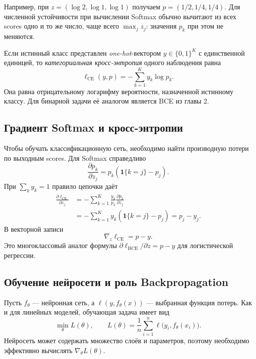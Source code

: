 \documentclass[12pt,a4paper]{article}
\begin{document}
Например, при $z=(\log2,\log1,\log1)$ получаем
$p=(1/2,1/4,1/4)$.
Для численной устойчивости при вычислении Softmax
обычно вычитают из всех scores одно и то же число,
чаще всего $\max_jz_j$: значения $p_k$ при этом не меняются.

Если истинный класс представлен \emph{one-hot}-вектором
$y\in\{0,1\}^K$ с единственной единицей, то
\emph{категориальная кросс-энтропия} одного наблюдения равна
\begin{equation}
    \ell_{\mathrm{CE}}(y,p)
       =-\sum_{k=1}^{K}y_k\log p_k.
    \label{eq:categorical-ce}
\end{equation}
Она равна отрицательному логарифму вероятности,
назначенной истинному классу. Для бинарной задачи её
аналогом является BCE из главы 2.

\subsection{Градиент Softmax и кросс-энтропии}

Чтобы обучать классификационную сеть, необходимо
найти производную потери по выходным scores.
Для Softmax справедливо
\[
    \frac{\partial p_k}{\partial z_j}
       =p_k(\mathbf1\{k=j\}-p_j).
\]
При $\sum_ky_k=1$ правило цепочки даёт
\begin{align*}
    \frac{\partial\ell_{\mathrm{CE}}}{\partial z_j}
       &=-\sum_{k=1}^{K}\frac{y_k}{p_k}
         \frac{\partial p_k}{\partial z_j}\\
       &=-\sum_{k=1}^{K}y_k(\mathbf1\{k=j\}-p_j)
        =p_j-y_j.
\end{align*}
В векторной записи
\begin{equation}
    \boxed{\nabla_z\ell_{\mathrm{CE}}=p-y}.
    \label{eq:softmax-ce-gradient}
\end{equation}
Это многоклассовый аналог формулы
$\partial\ell_{\mathrm{BCE}}/\partial z=p-y$
для логистической регрессии.

\subsection{Обучение нейросети и роль Backpropagation}

Пусть $f_\theta$ --- нейронная сеть,
а $\ell(y,f_\theta(x))$ --- выбранная функция потерь.
Как и для линейных моделей, обучающая задача имеет вид
\[
    \min_\theta L(\theta),\qquad
    L(\theta)=\frac1n\sum_{i=1}^{n}
       \ell\bigl(y_i,f_\theta(x_i)\bigr).
\]
Нейросеть может содержать множество слоёв и параметров,
поэтому необходимо эффективно вычислять
$\nabla_\theta L(\theta)$.
\end{document}
